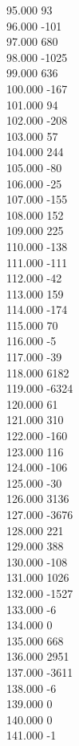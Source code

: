 { 95.000	93 \\
 96.000	-101 \\
 97.000	680 \\
 98.000	-1025 \\
 99.000	636 \\
 100.000	-167 \\
 101.000	94 \\
 102.000	-208 \\
 103.000	57 \\
 104.000	244 \\
 105.000	-80 \\
 106.000	-25 \\
 107.000	-155 \\
 108.000	152 \\
 109.000	225 \\
 110.000	-138 \\
 111.000	-111 \\
 112.000	-42 \\
 113.000	159 \\
 114.000	-174 \\
 115.000	70 \\
 116.000	-5 \\
 117.000	-39 \\
 118.000	6182 \\
 119.000	-6324 \\
 120.000	61 \\
 121.000	310 \\
 122.000	-160 \\
 123.000	116 \\
 124.000	-106 \\
 125.000	-30 \\
 126.000	3136 \\
 127.000	-3676 \\
 128.000	221 \\
 129.000	388 \\
 130.000	-108 \\
 131.000	1026 \\
 132.000	-1527 \\
 133.000	-6 \\
 134.000	0 \\
 135.000	668 \\
 136.000	2951 \\
 137.000	-3611 \\
 138.000	-6 \\
 139.000	0 \\
 140.000	0 \\
 141.000	-1 \\
}
